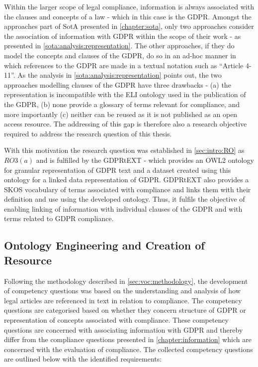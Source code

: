 Within the larger scope of legal compliance, information is always associated with the clauses and concepts of a law - which in this case is the GDPR.
Amongst the approaches part of SotA presented in \autoref{chapter:sota}, only two approaches consider the association of information with GDPR within the scope of their work - as presented in \autoref{sota:analysis:representation}.
The other approaches, if they do model the concepts and clauses of the GDPR, do so in an ad-hoc manner in which references to the GDPR are made in a textual notation such as ``Article 4-11''.
As the analysis in \autoref{sota:analysis:representation} points out, the two approaches modelling clauses of the GDPR have three drawbacks - (a) the representation is incompatible with the ELI ontology used in the publication of the GDPR, (b) none provide a glossary of terms relevant for compliance, and more importantly (c) neither can be reused as it is not published as an open access resource.
The addressing of this gap is therefore also a research objective required to address the research question of this thesis.

With this motivation the research question was established in \autoref{sec:intro:RO} as $RO3(a)$ and is fulfilled by the GDPRtEXT - which provides an OWL2 ontology for granular representation of GDPR text and a dataset created using this ontology for a linked data representation of GDPR. GDPRtEXT also provides a SKOS vocabulary of terms associated with compliance and links them with their definition and use using the developed ontology. Thus, it fulfils the objective of enabling linking of information with individual clauses of the GDPR and with terms related to GDPR compliance.

\subsection{Ontology Engineering and Creation of Resource}\label{sec:voc:gdprtext-engineering}
Following the methodology described in \autoref{sec:voc:methodology}, the development of competency questions was based on the understanding and analysis of how legal articles are referenced in text in relation to compliance. The competency questions are categorised based on whether they concern structure of GDPR or representation of concepts associated with compliance. These competency questions are concerned with associating information with GDPR and thereby differ from the compliance questions presented in \autoref{chapter:information} which are concerned with the evaluation of compliance. The collected competency questions are outlined below with the identified requirements:

